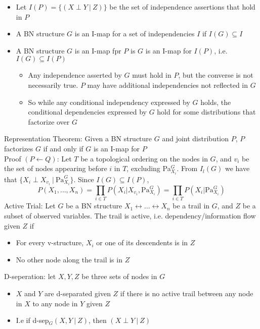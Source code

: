 \documentclass{article}
\begin{document}
\begin{itemize}
    \item Let $I(P) = \{(X \perp Y\ |\ Z)\}$ be the set of independence assertions that hold in $P$
    \item A BN structure $G$ is an I-map for a set of independencies $I$ if $I(G) \subseteq I$
    \item A BN structure $G$ is an I-map fpr $P$ is $G$ is an I-map for $I(P)$, i.e. $I(G) \subseteq I(P)$ \begin{itemize}
        \item Any independence asserted by $G$ must hold in $P$, but the converse is not necessarily true. $P$ may have additional independencies not reflected in $G$
        \item So while any conditional independency expressed by $G$ holds, the conditional dependencies expressed by $G$ hold for some distributions that factorize over $G$
    \end{itemize}
\end{itemize}
Representation Theorem: Given a BN structure $G$ and joint distribution $P$, $P$ factorizes $G$ if and only if $G$ is an I-map for $P$ \\[0.5ex]
Proof $(P \leftarrow Q)$: Let $T$ be a topological ordering on the nodes in $G$, and $v_i$ be the set of nodes appearing before $i$ in $T$, excluding Pa$^G_{X_i}$. From $I_{l}(G)$ we have that $\{X_i \perp X_{v_i}\ |\ \text{Pa}^G_{X_i}\}$. Since $I(G) \subseteq I(P)$, \begin{equation*}
    P(X_1, \dots , X_n) = \prod_{i \in T} P(X_i | X_{v_i}, \text{Pa}^G_{X_i}) = \prod_{i \in T} P(X_i | \text{Pa}^G_{X_i})
\end{equation*}
Active Trial: Let $G$ be a BN structure $X_1 \leftrightarrow \dots \leftrightarrow X_n$ be a trail in $G$, and $Z$ be a subset of observed variables. The trail is active, i.e. dependency/information flow given $Z$ if \begin{itemize}
    \item For every v-structure, $X_i$ or one of its descendents is in $Z$
    \item No other node along the trail is in $Z$
\end{itemize}
D-seperation: let $X, Y, Z$ be three sets of nodes in $G$\begin{itemize}
    \item $X$ and $Y$ are d-separated given $Z$ if there is no active trail between any node in $X$ to any node in $Y$ given $Z$
    \item I.e if d-sep$_G(X, Y\ |\ Z)$, then $(X \perp Y\ |\ Z)$
\end{itemize}
\end{document}
